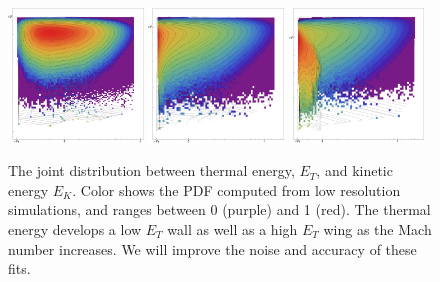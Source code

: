 
\begin{figure} \begin{center}
\includegraphics[width=0.32\textwidth]{figs/mach5_contours_comparison_V_MCMC.png}
\includegraphics[width=0.32\textwidth]{figs/mach10_contours_comparison_V_MCMC.png}
\includegraphics[width=0.32\textwidth]{figs/mach20_contours_comparison_V_MCMC.png}
\caption[ ]{The joint distribution between thermal energy, $E_T$, and kinetic
energy $E_K$. Color shows the PDF computed from low resolution simulations, and ranges between 0 (purple) and 1
(red).  The thermal energy develops a low $E_T$ wall as well as a high $E_T$
wing as the Mach number increases.  We will improve the noise and accuracy of
these fits.}
\label{fig.energy} \end{center} \end{figure}
